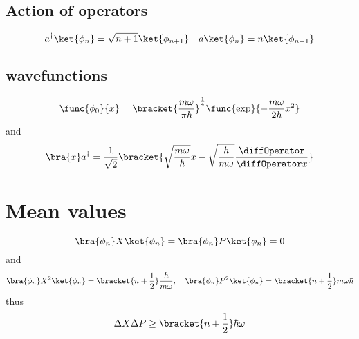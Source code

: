 \subsection{Action of operators}
\begin{equation*}
    a^{\dagger} \ket{\phi_n} = \sqrt{n + 1} \ket{\phi_{n+1}} \ \ \ a \ket{\phi_n} = n \ket{\phi_{n-1}}
\end{equation*}
\subsection{wavefunctions}
\begin{equation*}
    \func{\phi_0}{x} = \bracket{\frac{m\omega}{\pi \hbar}}^{\frac{1}{4}} \func{\exp}{-\dfrac{m \omega}{2 \hbar} x^2}
\end{equation*}
and
\begin{equation*}
    \bra{x}a^{\dagger} = \frac{1}{\sqrt{2}} \bracket{\sqrt{\dfrac{m\omega}{\hbar}} x - \sqrt{\dfrac{\hbar}{m \omega}} \frac{\diffOperator}{\diffOperator x}}
\end{equation*}
\section{Mean values }
\begin{equation*}
    \bra{\phi_n}X \ket{\phi_n} = \bra{\phi_n}P \ket{\phi_n} = 0
\end{equation*}
and
\begin{equation*}
    \bra{\phi_n}X^2 \ket{\phi_n} = \bracket{n + \frac{1}{2}} \frac{\hbar}{m \omega}, \ \ \ \bra{\phi_n}P^2 \ket{\phi_n} = \bracket{n + \frac{1}{2}} m \omega \hbar
\end{equation*}
thus
\begin{equation*}
    \Delta X \Delta P \geq \bracket{n + \frac{1}{2}} \hbar \omega
\end{equation*}
